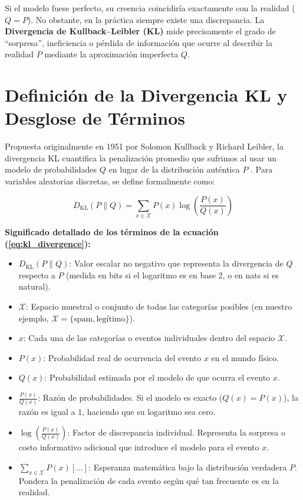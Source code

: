 \documentclass[conference]{IEEEtran}
\begin{document}
	Si el modelo fuese perfecto, su creencia coincidiría exactamente con la realidad ($Q = P$). No obstante, en la práctica siempre existe una discrepancia. La \textbf{Divergencia de Kullback--Leibler (KL)} \cite{kullback1951} mide precisamente el grado de ``sorpresa'', ineficiencia o pérdida de información que ocurre al describir la realidad $P$ mediante la aproximación imperfecta $Q$.
	
	\section{Definición de la Divergencia KL y Desglose de Términos}
	Propuesta originalmente en 1951 por Solomon Kullback y Richard Leibler, la divergencia KL cuantifica la penalización promedio que sufrimos al usar un modelo de probabilidades $Q$ en lugar de la distribución auténtica $P$ \cite{cover2006elements}. Para variables aleatorias discretas, se define formalmente como:
	
	\begin{equation}
		D_{\text{KL}}(P \parallel Q) = \sum_{x \in \mathcal{X}} P(x) \log\left(\frac{P(x)}{Q(x)}\right)
		\label{eq:kl_divergence}
	\end{equation}
	
	\noindent \textbf{Significado detallado de los términos de la ecuación (\ref{eq:kl_divergence}):}
	\begin{itemize}
		\item $D_{\text{KL}}(P \parallel Q)$: Valor escalar no negativo que representa la divergencia de $Q$ respecto a $P$ (medida en bits si el logaritmo es en base 2, o en nats si es natural).
		\item $\mathcal{X}$: Espacio muestral o conjunto de todas las categorías posibles (en nuestro ejemplo, $\mathcal{X} = \{\text{spam}, \text{legítimo}\}$).
		\item $x$: Cada una de las categorías o eventos individuales dentro del espacio $\mathcal{X}$.
		\item $P(x)$: Probabilidad real de ocurrencia del evento $x$ en el mundo físico.
		\item $Q(x)$: Probabilidad estimada por el modelo de que ocurra el evento $x$.
		\item $\frac{P(x)}{Q(x)}$: Razón de probabilidades. Si el modelo es exacto ($Q(x) = P(x)$), la razón es igual a $1$, haciendo que su logaritmo sea cero.
		\item $\log\left(\frac{P(x)}{Q(x)}\right)$: Factor de discrepancia individual. Representa la sorpresa o costo informativo adicional que introduce el modelo para el evento $x$.
		\item $\sum_{x \in \mathcal{X}} P(x) [\dots]$: Esperanza matemática bajo la distribución verdadera $P$. Pondera la penalización de cada evento según qué tan frecuente es en la realidad.
	\end{itemize}
	
\end{document}
